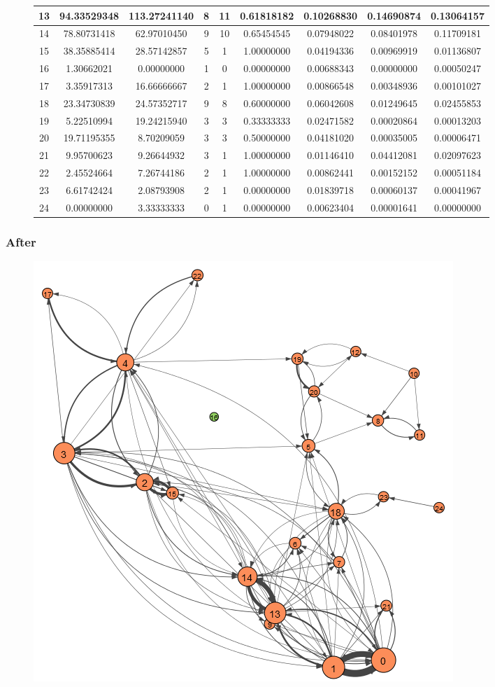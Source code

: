\documentclass[12pt,a4paper]{thesis}
\begin{document}
\begin{figure}[H]
\begin{tabular}{|c|c|c|c|c|c|c|c|c|}
\hline	13	&	94.33529348	&	113.27241140	&	8	&	11	&	0.61818182	&	0.10268830	&	0.14690874	&	0.13064157	\\
\hline	14	&	78.80731418	&	62.97010450	&	9	&	10	&	0.65454545	&	0.07948022	&	0.08401978	&	0.11709181	\\
\hline	15	&	38.35885414	&	28.57142857	&	5	&	1	&	1.00000000	&	0.04194336	&	0.00969919	&	0.01136807	\\
\hline	16	&	1.30662021	&	0.00000000	&	1	&	0	&	0.00000000	&	0.00688343	&	0.00000000	&	0.00050247	\\
\hline	17	&	3.35917313	&	16.66666667	&	2	&	1	&	1.00000000	&	0.00866548	&	0.00348936	&	0.00101027	\\
\hline	18	&	23.34730839	&	24.57352717	&	9	&	8	&	0.60000000	&	0.06042608	&	0.01249645	&	0.02455853	\\
\hline	19	&	5.22510994	&	19.24215940	&	3	&	3	&	0.33333333	&	0.02471582	&	0.00020864	&	0.00013203	\\
\hline	20	&	19.71195355	&	8.70209059	&	3	&	3	&	0.50000000	&	0.04181020	&	0.00035005	&	0.00006471	\\
\hline	21	&	9.95700623	&	9.26644932	&	3	&	1	&	1.00000000	&	0.01146410	&	0.04412081	&	0.02097623	\\
\hline	22	&	2.45524664	&	7.26744186	&	2	&	1	&	1.00000000	&	0.00862441	&	0.00152152	&	0.00051184	\\
\hline	23	&	6.61742424	&	2.08793908	&	2	&	1	&	0.00000000	&	0.01839718	&	0.00060137	&	0.00041967	\\
\hline	24	&	0.00000000	&	3.33333333	&	0	&	1	&	0.00000000	&	0.00623404	&	0.00001641	&	0.00000000	\\
\hline 
\end{tabular} 
\end{figure}

\subsubsection{After}

\begin{figure}[H]
\centering
\includegraphics[width=0.35\linewidth]{./AfterViz/radModel}
\caption{}
\label{fig:radModelAfter}
\end{figure}
\end{document}
